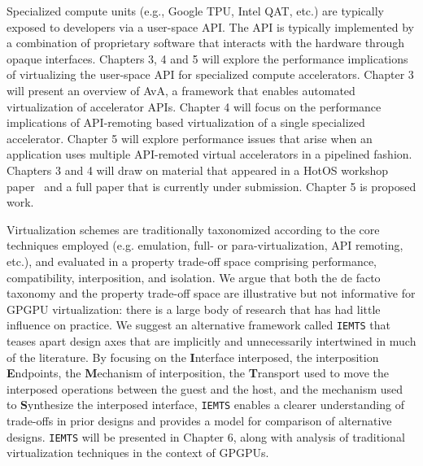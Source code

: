 Specialized compute units (e.g., Google TPU, Intel QAT, etc.) are
typically exposed to developers via a user-space API. The API is typically
implemented by a combination of proprietary software that interacts with the
hardware through opaque interfaces.
Chapters 3, 4 and 5 will explore the performance implications of
virtualizing the user-space API for specialized compute accelerators.
Chapter 3 will present an overview of AvA, a framework that enables automated
virtualization of accelerator APIs. Chapter 4 will focus on the performance
implications of API-remoting based virtualization of a single specialized
accelerator. Chapter 5 will explore performance issues that arise when an
application uses multiple API-remoted virtual accelerators in a pipelined
fashion. Chapters 3 and 4 will draw on material that appeared in a HotOS
workshop paper~\cite{ava-hotos} and a full paper that is currently under
submission. Chapter 5 is proposed work.

Virtualization schemes are traditionally taxonomized according to the core
techniques employed (e.g. emulation, full- or para-virtualization, API
remoting, etc.), and evaluated in a property trade-off space comprising
performance, compatibility, interposition, and isolation. We argue that both
the de facto taxonomy and the property trade-off space are illustrative but
not informative for GPGPU virtualization: there is a large body of research
that has had little influence on practice. We suggest an alternative framework
called \texttt{IEMTS} that teases apart design axes that are implicitly and
unnecessarily intertwined in much of the literature. By focusing on the
\textbf{I}nterface interposed, the interposition \textbf{E}ndpoints, the
\textbf{M}echanism of interposition, the \textbf{T}ransport used to move the
interposed operations between the guest and the host, and the mechanism used
to \textbf{S}ynthesize the interposed interface, \texttt{IEMTS} enables a
clearer understanding of trade-offs in prior designs and provides a model for
comparison of alternative designs. \texttt{IEMTS} will be presented in Chapter
6, along with analysis of traditional virtualization techniques in the context
of GPGPUs.

